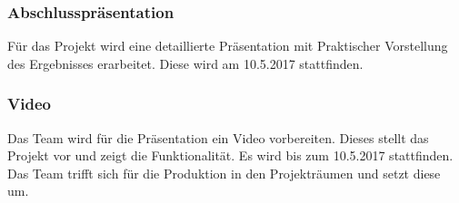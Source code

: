 \subsubsection{Abschlusspräsentation}
Für das Projekt wird eine detaillierte Präsentation mit Praktischer Vorstellung des Ergebnisses erarbeitet. Diese wird am 10.5.2017 stattfinden.
 \subsubsection{Video}
Das Team wird für die Präsentation ein Video vorbereiten. Dieses stellt das Projekt vor und zeigt die Funktionalität. Es wird bis zum 10.5.2017 stattfinden. Das Team trifft sich für die Produktion in den Projekträumen und setzt diese um.


